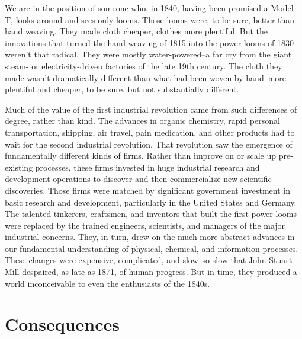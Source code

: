 \documentclass[12pt]{article}
\begin{document}
We are in the position of someone who, in 1840, having been promised a
Model T, looks around and sees only looms. Those looms were, to be
sure, better than hand weaving. They made cloth cheaper, clothes more
plentiful. But the innovations that turned the hand weaving of
1815 into the power looms of 1830 weren't that radical. They were
mostly water-powered--a far cry from the giant steam- or
electricity-driven factories of the late 19th century. The cloth they
made wasn't dramatically different than what had been woven by
hand--more plentiful and cheaper, to be sure, but not substantially
different.  

Much of the value of the first industrial revolution came from such
differences of degree, rather than kind. The advances in organic
chemistry, rapid personal transportation, shipping, air travel, pain
medication, and other products had to wait for the second industrial
revolution. That revolution saw the emergence of fundamentally
different kinds of firms. Rather than improve on or scale up pre-existing
processes, these firms invested in huge industrial research and
development operations to discover and then commercialize new
scientific discoveries. Those firms were matched by significant
government investment in basic research and development, particularly
in the United States and Germany. The talented tinkerers, craftsmen,
and inventors that built the first power looms were replaced by the
trained engineers, scientists, and managers of the major industrial
concerns. They, in turn, drew on the much more abstract
advances in our fundamental understanding of physical, chemical, and
information processes. These changes were expensive, complicated, and
slow--so slow that John Stuart Mill despaired, as late as 1871, of
human progress. But in time, they produced a world inconceivable to
even the enthusiasts of the 1840s. 


\section{Consequences}
\label{sec:consequences}
\end{document}
